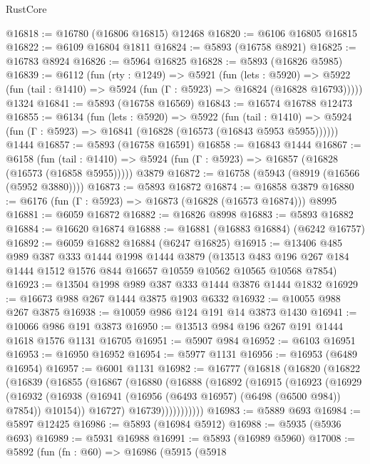 \begin{lexlean}{RustCore}
\begin{coremodule}
@16818 := @16780 (@16806 @16815) @12468
@16820 := @6106 @16805 @16815
@16822 := @6109 @16804 @1811
@16824 := @5893 (@16758 @8921)
@16825 := @16783 @8924
@16826 := @5964 @16825
@16828 := @5893 (@16826 @5985)
@16839 := @6112
    (fun (rty : @1249) =>
    @5921
      (fun (lets : @5920) =>
      @5922 (fun (tail : @1410) => @5924 (fun (Γ : @5923) => @16824 (@16828 @16793)))))
    @1324
@16841 := @5893 (@16758 @16569)
@16843 := @16574 @16788 @12473
@16855 := @6134
    (fun (lets : @5920) =>
    @5922
      (fun (tail : @1410) =>
      @5924 (fun (Γ : @5923) => @16841 (@16828 (@16573 (@16843 @5953 @5955))))))
    @1444
@16857 := @5893 (@16758 @16591)
@16858 := @16843 @1444
@16867 := @6158
    (fun (tail : @1410) => @5924 (fun (Γ : @5923) => @16857 (@16828 (@16573 (@16858 @5955)))))
    @3879
@16872 := @16758 (@5943 (@8919 (@16566 (@5952 @3880))))
@16873 := @5893 @16872
@16874 := @16858 @3879
@16880 := @6176 (fun (Γ : @5923) => @16873 (@16828 (@16573 @16874))) @8995
@16881 := @6059 @16872
@16882 := @16826 @8998
@16883 := @5893 @16882
@16884 := @16620 @16874
@16888 := @16881 (@16883 @16884) (@6242 @16757)
@16892 := @6059 @16882 @16884 (@6247 @16825)
@16915 := @13406
    @485
    @989
    @387
    @333
    @1444
    @1998
    @1444
    @3879
    (@13513 @483 @196 @267 @184 @1444 @1512 @1576 @844 @16657 @10559 @10562 @10565 @10568 @7854)
@16923 := @13504 @1998 @989 @387 @333 @1444 @3876 @1444 @1832
@16929 := @16673 @988 @267 @1444 @3875 @1903 @6332
@16932 := @10055 @988 @267 @3875
@16938 := @10059 @986 @124 @191 @14 @3873 @1430
@16941 := @10066 @986 @191 @3873
@16950 := @13513 @984 @196 @267 @191 @1444 @1618 @1576 @1131 @16705
@16951 := @5907 @984
@16952 := @6103 @16951
@16953 := @16950 @16952
@16954 := @5977 @1131
@16956 := @16953 (@6489 @16954)
@16957 := @6001 @1131
@16982 := @16777
    (@16818
      (@16820
        (@16822
          (@16839
            (@16855
              (@16867
                (@16880
                  (@16888
                    (@16892
                      (@16915
                        (@16923
                          (@16929
                            (@16932
                              (@16938
                                (@16941 (@16956 (@6493 @16957) (@6498 (@6500 @984)) @7854))
                                @10154))
                            @16727)
                          @16739)))))))))))
@16983 := @5889 @693
@16984 := @5897 @12425
@16986 := @5893 (@16984 @5912)
@16988 := @5935 (@5936 @693)
@16989 := @5931 @16988
@16991 := @5893 (@16989 @5960)
@17008 := @5892
    (fun (fn : @60) =>
    @16986
      (@5915
        (@5918

\end{coremodule}
\end{lexlean}
